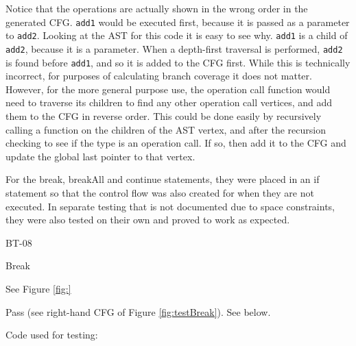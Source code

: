 Notice that the operations are actually shown in the wrong order in the generated CFG. \verb|add1| would be executed first, because it is passed as a parameter to \verb|add2|. Looking at the AST for this code it is easy to see why. \verb|add1| is a child of \verb|add2|, because it is a parameter. When a depth-first traversal is performed, \verb|add2| is found before \verb|add1|, and so it is added to the CFG first. While this is technically incorrect, for purposes of calculating branch coverage it does not matter. However, for the more general purpose use, the operation call function would need to traverse its children to find any other operation call vertices, and add them to the CFG in reverse order. This could be done easily by recursively calling a function on the children of the AST vertex, and after the recursion checking to see if the type is an operation call. If so, then add it to the CFG and update the global last pointer to that vertex.

\begin{figure}
\centering
\begin{minipage}{.25\textwidth}
  \centering
  \caption{}
  \label{fig:testBreak}
\end{minipage}%
\begin{minipage}{.25\textwidth}
  \centering
  \caption{}
  \label{fig:testBreakAll}
\end{minipage}%
\begin{minipage}{.25\textwidth}
  \centering
    \caption{}
  	\label{fig:testContinue}
\end{minipage}
\end{figure}
For the break, breakAll and continue statements, they were placed in an if statement so that the control flow was also created for when they are not executed. In separate testing that is not documented due to space constraints, they were also tested on their own and proved to work as expected.

\begin{minipage}{.6\textwidth}
\begin{description}[style=sameline,leftmargin=4.5cm,nolistsep]
\item[\hspace*{0.3cm}Label] BT-08
\item[\hspace*{0.3cm}Statement under Test] Break
\item[\hspace*{0.3cm}Expected Output] See Figure \ref{fig:}
\item[\hspace*{0.3cm}Result] Pass (see right-hand CFG of Figure \ref{fig:testBreak}). See below.
\end{description}
\end{minipage}
\begin{minipage}{.39\textwidth}
  \centering
  Code used for testing:
  
\end{minipage}

